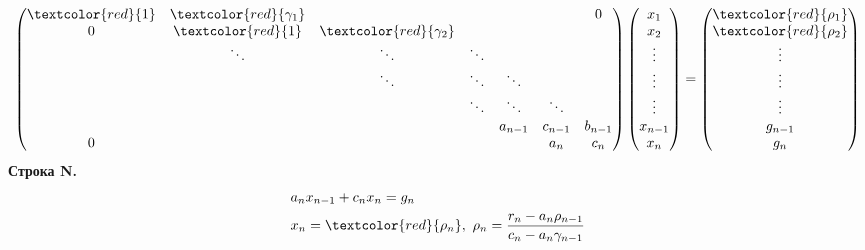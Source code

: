 \begin{align*}
  \begin{pmatrix}
    \textcolor{red}{1} & \textcolor{red}{\gamma_1} & &  &  &  & 0 \\
    0 & \textcolor{red}{1} & \textcolor{red}{\gamma_2} &  & & & \\
     &   \ddots & \ddots & \ddots & & & \\
     & &  \ddots & \ddots & \ddots & &  \\
     & & & \ddots & \ddots & \ddots &  \\
     &  &  & & a_{n-1} & c_{n-1} & b_{n-1} \\
     0 & & & &  &a_n & c_n
  \end{pmatrix}
  \begin{pmatrix}
    x_1 \\
    x_2 \\
    \vdots \\
    \vdots \\
    \vdots \\
    x_{n-1} \\
    x_n
  \end{pmatrix} =
  \begin{pmatrix}
    \textcolor{red}{\rho_1} \\
    \textcolor{red}{\rho_2} \\
    \vdots \\
    \vdots \\
    \vdots \\
    g_{n-1} \\
    g_n
  \end{pmatrix}
\end{align*}
\newline
\textbf{Строка N.}
\begin{align*}
  &a_n x_{n-1} + c_n x_n = g_n \\
  &x_n= \textcolor{red}{\rho_n},\ \rho_n=\frac{r_n - a_n \rho_{n-1}}{c_n -a_n \gamma_{n-1}}
\end{align*}
